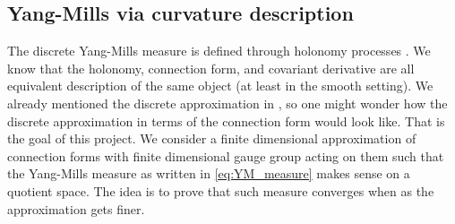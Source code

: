 \documentclass[12pt]{article}
\numberwithin{equation}{section}
\theoremstyle{definition}
\theoremstyle{remark}
\newcommand{\1}{\mathbf 1}
\newcommand{\<}{\langle}
\renewcommand{\>}{\rangle}
\begin{document}










\subsection{Yang-Mills via curvature description}
The discrete Yang-Mills measure is defined through holonomy processes \cite{Levy03}. We know that the holonomy, connection form, and covariant derivative are all equivalent description of the same object (at least in the smooth setting). We already mentioned the discrete approximation in , so one might wonder how the discrete approximation in terms of the connection form would look like. That is the goal of this project. We consider a finite dimensional approximation of connection forms with finite dimensional gauge group acting on them such that the Yang-Mills measure as written in  \eqref{eq:YM_measure} makes sense on a quotient space. The idea is to prove that such measure converges when as the approximation gets finer. 
\end{document}

